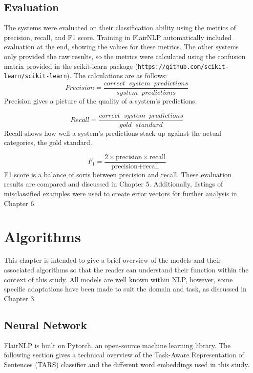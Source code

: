 \documentclass [11pt, proquest] {uwthesis}[2020/02/24]
\begin{document}
\section{Evaluation}
The systems were evaluated on their classification ability using the metrics of precision, recall, and F1 score. Training in FlairNLP automatically included evaluation at the end, showing the values for these metrics. The other systems only provided the raw results, so the metrics were calculated using the confusion matrix provided in the scikit-learn package (\texttt{https://github.com/scikit-learn/scikit-learn}). The calculations are as follows:
\begin{equation}
Precision = \frac{correct\;\;system\;\;predictions}{system\;\;predictions}
\end{equation}
Precision gives a picture of the quality of a system's predictions.

\begin{equation}
Recall = \frac{correct\;\;system\;\;predictions}{gold\;\;standard}
\end{equation}
Recall shows how well a system's predictions stack up against the actual categories, the gold standard. 

\begin{equation}
F_{1}=\frac{{2}\times\text{precision} \times \text{recall}}{\text{precision} + \text{recall}}
\end{equation}
F1 score is a balance of sorts between precision and recall. These evaluation results are compared and discussed in Chapter 5. Additionally, listings of misclassified examples were used to create error vectors for further analysis in Chapter 6.

 
\chapter{Algorithms}
This chapter is intended to give a brief overview of the models and their associated algorithms so that the reader can understand their function within the context of this study. All models are well known within NLP, however, some specific adaptations have been made to suit the domain and task, as discussed in Chapter 3. 

\section{Neural Network}
FlairNLP is built on Pytorch, an open-source machine learning library. The following section gives a technical overview of the Task-Aware Representation of Sentences (TARS) classifier and the different word embeddings used in this study.
\end{document}
